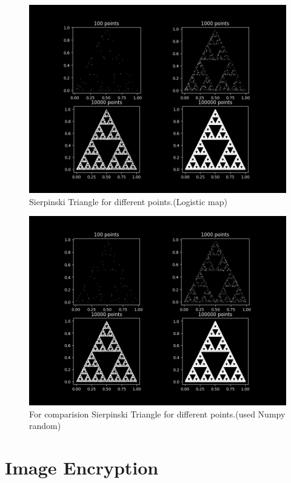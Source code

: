 \documentclass{report}
\begin{document}
\begin{figure}[!h]
    \centering
    \includegraphics[scale=.38]{images/ilmtri.png}
    \caption{Sierpinski Triangle for different points.(Logistic map)}
    \label{fig:my_label11}
\end{figure}

\begin{figure}[!h]
    \centering
    \includegraphics[scale=.4]{images/numpytri.png}
    \caption{For comparision Sierpinski Triangle for different points.(used Numpy random)}
    \label{fig:my_label12}
\end{figure}
\newpage
\section{Image Encryption}
\end{document}
